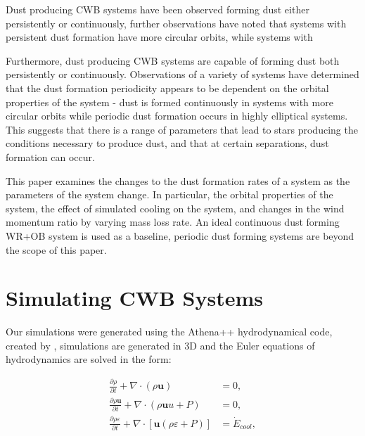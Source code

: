 
Dust producing CWB systems have been observed forming dust either persistently or continuously, further observations have noted that systems with persistent dust formation have more circular orbits, while systems with 

Furthermore, dust producing CWB systems are capable of forming dust both persistently or continuously.
Observations of a variety of systems have determined that the dust formation periodicity appears to be dependent on the orbital properties of the system - dust is formed continuously in systems with more circular orbits while periodic dust formation occurs in highly elliptical systems. This suggests that there is a range of parameters that lead to stars producing the conditions necessary to produce dust, and that at certain separations, dust formation can occur.




This paper examines the changes to the dust formation rates of a system as the parameters of the system change. In particular, the orbital properties of the system, the effect of simulated cooling on the system, and changes in the wind momentum ratio by varying mass loss rate. An ideal continuous dust forming WR+OB system is used as a baseline, periodic dust forming systems are beyond the scope of this paper. 


\section{Simulating CWB Systems}



Our simulations were generated using the Athena++ hydrodynamical code, created by \cite{stoneAthenaAdaptiveMesh2020}, simulations are generated in 3D and the Euler equations of hydrodynamics are solved in the form:



\begin{subequations}
  \begin{align}
    \frac{\partial\rho}{\partial t}+\nabla \cdot \left(\rho \boldsymbol{u}\right) & = 0 , \\
    \frac{\partial \rho \boldsymbol{u}}{\partial t} + \nabla \cdot \left(\rho \boldsymbol{u} u + P \right) & = 0, \\
    \frac{\partial \rho \varepsilon}{\partial t} + \nabla \cdot \left[ \boldsymbol{u} \left( \rho\varepsilon + P \right) \right] & = \dot E_{cool} , 
  \end{align}
\end{subequations}

